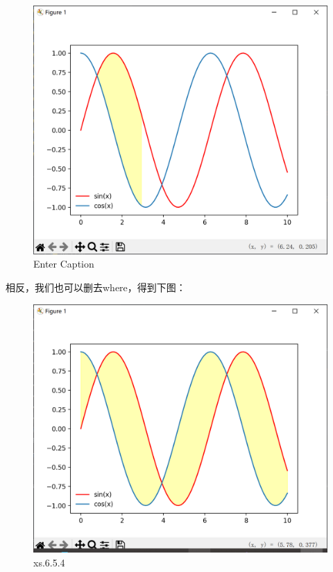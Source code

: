 \documentclass[12pt]{article}
\begin{document}
\begin{figure}[H]
    \centering
    \includegraphics[width=0.6\linewidth]{曲线间颜色填充 Pic2.png}
    \caption{Enter Caption}
    \label{fig:enter-label}
\end{figure}
相反，我们也可以删去where，得到下图：
\begin{figure}[H]
    \centering
    \includegraphics[width=0.6\linewidth]{image.png}
    \caption{xs.6.5.4}
    \label{fig:enter-label}
\end{figure}
\end{document}
